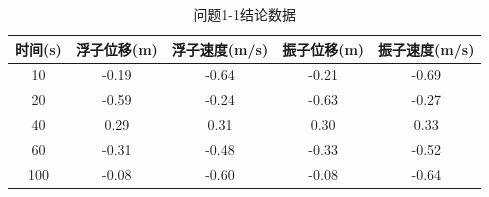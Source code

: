 \documentclass{article}
\numberwithin{equation}{subsection}
\begin{document}
\begin{table}[!htbp]
    \centering
    \begin{tabular}{|c|c|c|c|c|}\hline
        时间(s) &浮子位移(m)&浮子速度(m/s)&振子位移(m)&振子速度(m/s)\\\hline
        10&-0.19

        &-0.64

        &-0.21

        &-0.69

        \\
        20&-0.59

        &-0.24

        &-0.63

        &-0.27

        \\
        40&0.29

        &0.31

        &0.30

        &0.33

        \\
        60&-0.31

        &-0.48

        &-0.33

        &-0.52

        \\
        100&-0.08

        &-0.60

        &-0.08

        &-0.64

        \\
        \hline
    \end{tabular}
    \caption{问题1-1结论数据}
\end{table}
\end{document}
